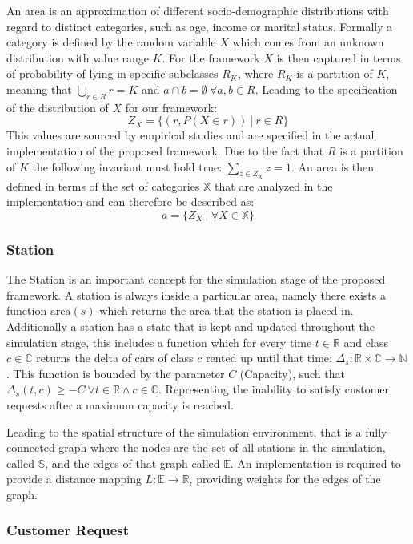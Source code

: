 An area is an approximation of different socio-demographic distributions with regard to 
distinct categories, such as age, income or marital status. Formally a category is defined by the random variable $X$ which
comes from an unknown distribution with value range $K$. For the framework $X$ is then
captured in terms of probability of lying in specific
subclasses $R_K$, where $R_K$ is a partition of $K$, meaning that
$\bigcup_{r \in R} r = K$ and $a \cap b = \emptyset \ \forall a, b \in R$. Leading to the
specification of the distribution of $X$ for our framework:
$$
Z_X = \{ (r, P(X \in r)) \ |\ r \in R \}
$$
This values are sourced by empirical studies and are specified in the actual implementation
of the proposed framework.
Due to the fact that $R$ is a partition of $K$ the following invariant must hold true: $\sum_{z \in Z_X} z = 1$.
An area is then defined in terms of the set of categories $\mathbb{X}$ that are analyzed in the implementation 
and can therefore be described as:
$$
a = \{ Z_X \ | \ \forall X \in \mathbb{X} \}
$$

\subsubsection{Station}
\label{sub_sec:Method/Concepts/Station}

The Station is an important concept for the simulation stage of the proposed framework. A station is always
inside a particular area, namely there exists a function $\text{area}(s)$ which returns the area that the 
station is placed in. Additionally a station has a state that is kept and updated throughout the simulation
stage, this includes a function which for every time $t \in \mathbb{R}$ and class $c \in \mathbb{C}$ returns
the delta of cars of class $c$ rented up until that time: $\Delta_s: \mathbb{R} \times \mathbb{C} \to \mathbb{N}$. This function
is bounded by the parameter $C$ (Capacity), such that $\Delta_s(t, c) \ge -C \ \forall t \in \mathbb{R} \land c \in \mathbb{C}$.
Representing the inability to satisfy customer requests after a maximum capacity is reached.

Leading to the spatial structure of the simulation environment, that is a fully connected graph where the nodes are 
the set of all stations in the simulation, called $\mathbb{S}$, and the edges of that graph called $\mathbb{E}$. An implementation
is required to provide a distance mapping $L: \mathbb{E} \to \mathbb{R}$, providing weights for the edges of the graph.

\subsubsection{Customer Request}
\label{sub_sec:Method/Concepts/Request}


